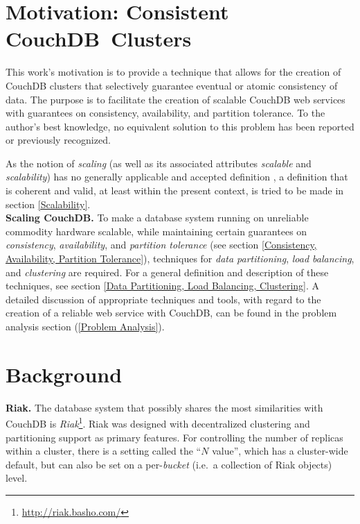 \section{Motivation: Consistent CouchDB~Clusters}
\label{Motivation: Consistent CouchDB Clusters}

This work's motivation is to provide a technique that allows for the creation of CouchDB clusters that selectively guarantee eventual or atomic consistency of data. The purpose is to facilitate the creation of scalable CouchDB web services with guarantees on consistency, availability, and partition tolerance. To the author's best knowledge, no equivalent solution to this problem has been reported or previously recognized.

As the notion of \emph{scaling} (as well as its associated attributes \emph{scalable} and \emph{scalability}) has no generally applicable and accepted definition \cite{Hil90} \cite{DRW06} \cite[p.~145]{ASL10}, a definition that is coherent and valid, at least within the present context, is tried to be made in section \ref{Scalability}.\\

\noindent
{\bf Scaling CouchDB.}
To make a database system running on unreliable commodity hardware scalable, while maintaining certain guarantees on \emph{consistency}, \emph{availability}, and \emph{partition tolerance} (see section \ref{Consistency, Availability, Partition Tolerance}), techniques for \emph{data partitioning}, \emph{load balancing}, and \emph{clustering} are required. For a general definition and description of these techniques, see section \ref{Data Partitioning, Load Balancing, Clustering}. A detailed discussion of appropriate techniques and tools, with regard to the creation of a reliable web service with CouchDB, can be found in the problem analysis section (\ref{Problem Analysis}).


\section{Background}
\label{Background}

{\bf Riak.}
The database system that possibly shares the most similarities with CouchDB is \emph{Riak}\footnote{\url{http://riak.basho.com/}}. Riak was designed with decentralized clustering and partitioning support as primary features. For controlling the number of replicas within a cluster, there is a setting called the ``$N$ value'', which has a cluster-wide default, but can also be set on a per-\emph{bucket} (i.e.\ a collection of Riak objects) level.

